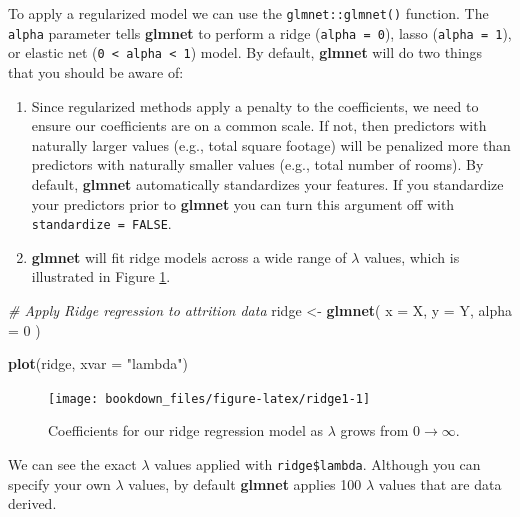 \documentclass[]{krantz}
\makeatletter
\newenvironment{Shaded}{\begin{snugshade}}{\end{snugshade}}
\newcommand{\CommentTok}[1]{\textcolor[rgb]{0.37,0.37,0.37}{\textit{#1}}}
\newcommand{\DataTypeTok}[1]{\textcolor[rgb]{0.27,0.27,0.27}{#1}}
\newcommand{\DecValTok}[1]{\textcolor[rgb]{0.06,0.06,0.06}{#1}}
\newcommand{\KeywordTok}[1]{\textcolor[rgb]{0.27,0.27,0.27}{\textbf{#1}}}
\newcommand{\NormalTok}[1]{#1}
\newcommand{\StringTok}[1]{\textcolor[rgb]{0.5,0.5,0.5}{#1}}
\providecommand{\tightlist}{%
  \setlength{\itemsep}{0pt}\setlength{\parskip}{0pt}}
\newenvironment{kframe}{%
\medskip{}
\setlength{\fboxsep}{.8em}
 \def\at@end@of@kframe{}%
 \ifinner\ifhmode%
  \def\at@end@of@kframe{\end{minipage}}%
  \begin{minipage}{\columnwidth}%
 \fi\fi%
 \def\FrameCommand##1{\hskip\@totalleftmargin \hskip-\fboxsep
 \colorbox{shadecolor}{##1}\hskip-\fboxsep
     \hskip-\linewidth \hskip-\@totalleftmargin \hskip\columnwidth}%
 \MakeFramed {\advance\hsize-\width
   \@totalleftmargin\z@ \linewidth\hsize
   \@setminipage}}%
 {\par\unskip\endMakeFramed%
 \at@end@of@kframe}
\renewenvironment{Shaded}{\begin{kframe}}{\end{kframe}}
\makeatother
\begin{document}
To apply a regularized model we can use the \texttt{glmnet::glmnet()} function. The \texttt{alpha} parameter tells \textbf{glmnet} to perform a ridge (\texttt{alpha\ =\ 0}), lasso (\texttt{alpha\ =\ 1}), or elastic net (\texttt{0\ \textless{}\ alpha\ \textless{}\ 1}) model. By default, \textbf{glmnet} will do two things that you should be aware of:

\begin{enumerate}
\def\labelenumi{\arabic{enumi}.}
\tightlist
\item
  Since regularized methods apply a penalty to the coefficients, we need to ensure our coefficients are on a common scale. If not, then predictors with naturally larger values (e.g., total square footage) will be penalized more than predictors with naturally smaller values (e.g., total number of rooms). By default, \textbf{glmnet} automatically standardizes your features. If you standardize your predictors prior to \textbf{glmnet} you can turn this argument off with \texttt{standardize\ =\ FALSE}.
\item
  \textbf{glmnet} will fit ridge models across a wide range of \(\lambda\) values, which is illustrated in Figure \ref{fig:ridge1}.
\end{enumerate}

\begin{Shaded}
\begin{Highlighting}[]
\CommentTok{# Apply Ridge regression to attrition data}
\NormalTok{ridge <-}\StringTok{ }\KeywordTok{glmnet}\NormalTok{(}
  \DataTypeTok{x =}\NormalTok{ X,}
  \DataTypeTok{y =}\NormalTok{ Y,}
  \DataTypeTok{alpha =} \DecValTok{0}
\NormalTok{)}

\KeywordTok{plot}\NormalTok{(ridge, }\DataTypeTok{xvar =} \StringTok{"lambda"}\NormalTok{)}
\end{Highlighting}
\end{Shaded}

\begin{figure}

{\centering \texttt{[image: bookdown\_files/figure-latex/ridge1-1]} 

}

\caption{Coefficients for our ridge regression model as $\lambda$ grows from  $0 \rightarrow \infty$.}\label{fig:ridge1}
\end{figure}

We can see the exact \(\lambda\) values applied with \texttt{ridge\$lambda}. Although you can specify your own \(\lambda\) values, by default \textbf{glmnet} applies 100 \(\lambda\) values that are data derived.
\end{document}

